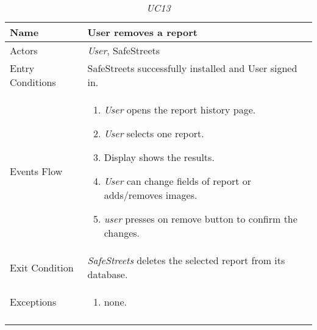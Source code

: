 \documentclass[../../../RASD.tex]{subfiles}
\begin{document}
    \begin{center}
    \begin{longtable}{| p{.35\linewidth} | p{.65\linewidth} |}
    \hline
    \textbf{Name} & \textbf{User removes a report}\\ \hline
    Actors & \textit{User}, SafeStreets\\ \hline
    Entry Conditions & SafeStreets successfully installed and User signed in.\\ \hline
    Events Flow &
    \begin{enumerate}
    \item \textit{User} opens the report history page.
    \item \textit{User} selects one report.
    \item  Display shows the results.
    \item \textit{User} can change fields of report or adds/removes images.
    \item \textit{user} presses on remove button to confirm the changes.
    \end{enumerate}
    \\ \hline
    Exit Condition & \textit{SafeStreets} deletes the selected report from its database.\\ \hline
    Exceptions &
    \begin{enumerate}
    \item none.
    \end{enumerate}
    \\
    \hline
    \caption[\textit{Use Case 13}]{\textit{UC13}}
    \end{longtable}
    \end{center}
    \newpage
\end{document}
